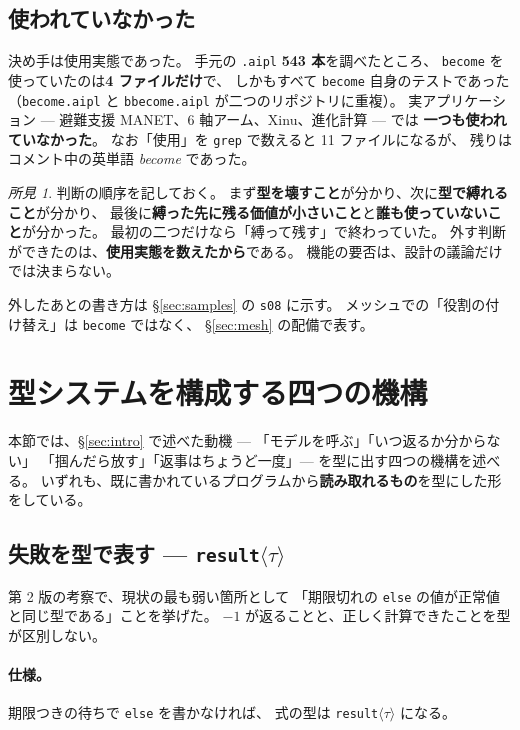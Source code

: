 \documentclass[11pt,a4paper]{ltjsarticle}
\theoremstyle{definition}
\theoremstyle{remark}
\newtheorem{finding}[theorem]{所見}
\begin{document}
\subsection{使われていなかった}

決め手は使用実態であった。
手元の \texttt{.aipl} \textbf{543 本}を調べたところ、
\texttt{become} を使っていたのは\textbf{4 ファイルだけ}で、
しかもすべて \texttt{become} 自身のテストであった
（\texttt{become.aipl} と \texttt{bbecome.aipl} が二つのリポジトリに重複）。
実アプリケーション --- 避難支援 MANET、6 軸アーム、Xinu、進化計算 --- では
\textbf{一つも使われていなかった}。
なお「使用」を \texttt{grep} で数えると 11 ファイルになるが、
残りはコメント中の英単語 \emph{become} であった。

\begin{finding}
判断の順序を記しておく。
まず\textbf{型を壊すこと}が分かり、次に\textbf{型で縛れること}が分かり、
最後に\textbf{縛った先に残る価値が小さいこと}と\textbf{誰も使っていないこと}が分かった。
最初の二つだけなら「縛って残す」で終わっていた。
外す判断ができたのは、\textbf{使用実態を数えたから}である。
機能の要否は、設計の議論だけでは決まらない。
\end{finding}

外したあとの書き方は \S\ref{sec:samples} の \texttt{s08} に示す。
メッシュでの「役割の付け替え」は \texttt{become} ではなく、
\S\ref{sec:mesh} の配備で表す。

\section{型システムを構成する四つの機構}
\label{sec:new}

本節では、\S\ref{sec:intro} で述べた動機 --- 「モデルを呼ぶ」「いつ返るか分からない」
「掴んだら放す」「返事はちょうど一度」--- を型に出す四つの機構を述べる。
いずれも、既に書かれているプログラムから\textbf{読み取れるもの}を型にした形をしている。

\subsection{失敗を型で表す --- \texttt{result}$\langle\tau\rangle$}
\label{sec:result}

第 2 版の考察で、現状の最も弱い箇所として
「期限切れの \texttt{else} の値が正常値と同じ型である」ことを挙げた。
$-1$ が返ることと、正しく計算できたことを型が区別しない。

\paragraph{仕様。}
期限つきの待ちで \texttt{else} を書かなければ、
式の型は \texttt{result}$\langle\tau\rangle$ になる。
\end{document}
